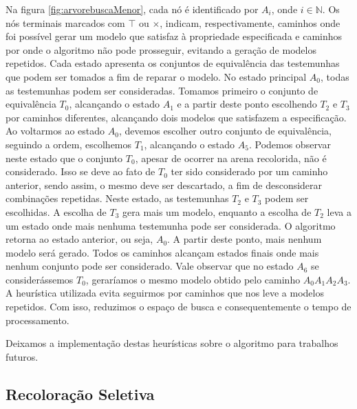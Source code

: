 \documentclass[normaltoc,capchap,capsec,times]{abnt}
\begin{document}
Na figura \ref{fig:arvorebuscaMenor}, cada nó é identificado por $A_i$, onde $i \in  \mathbb{N}$. Os nós terminais marcados com $\top$ ou $\times$, indicam, respectivamente, caminhos onde foi possível gerar um modelo que satisfaz à propriedade especificada e caminhos por onde o algoritmo não pode prosseguir, evitando a geração de modelos repetidos. Cada estado apresenta os conjuntos de equivalência das testemunhas que podem ser tomados a fim de reparar o modelo. No estado principal $A_0$, todas as testemunhas podem ser consideradas. Tomamos primeiro o conjunto de equivalência $T_0$, alcançando o estado $A_1$ e a partir deste ponto escolhendo $T_2$ e $T_3$ por caminhos diferentes, alcançando dois modelos que satisfazem a especificação.  Ao voltarmos ao estado $A_0$, devemos escolher outro conjunto de equivalência, seguindo a ordem, escolhemos $T_1$, alcançando o estado $A_5$. Podemos observar neste estado que o conjunto $T_0$, apesar de ocorrer na arena recolorida, não é considerado. Isso se deve ao fato de $T_0$ ter sido considerado por um caminho anterior, sendo assim, o mesmo deve ser descartado, a fim de desconsiderar combinações repetidas. Neste estado, as testemunhas $T_2$ e $T_3$ podem ser escolhidas. A escolha de $T_3$ gera mais um modelo, enquanto a escolha de $T_2$  leva a um estado onde mais nenhuma testemunha pode ser considerada. O algoritmo retorna ao estado anterior, ou seja, $A_0$. A partir deste ponto, mais nenhum modelo será gerado. Todos os caminhos alcançam estados finais onde mais nenhum conjunto pode ser considerado. Vale observar que no estado $A_6$ se considerássemos $T_0$, geraríamos o mesmo modelo obtido pelo caminho $A_0A_1A_2A_3$. A heurística utilizada evita seguirmos por caminhos que nos leve a modelos repetidos. Com isso, reduzimos o espaço de busca e consequentemente o tempo de processamento.

Deixamos a implementação destas heurísticas sobre o algoritmo para trabalhos futuros.


\subsection{Recoloração Seletiva}
\end{document}
